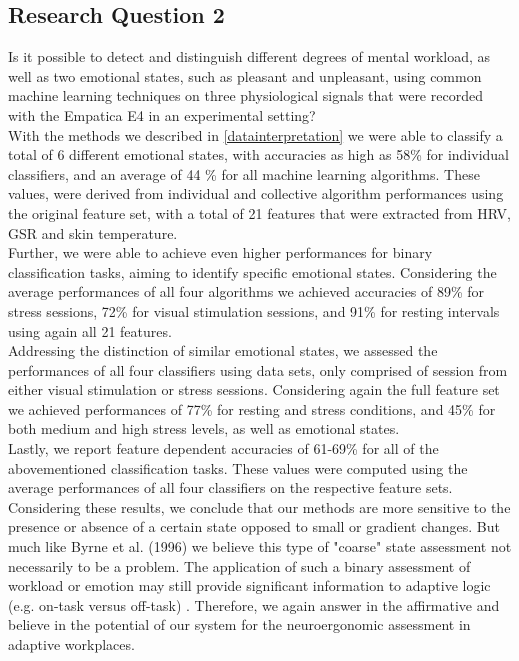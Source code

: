 \subsection{Research Question 2}  
Is it possible to detect and distinguish different degrees of mental workload, as well as two emotional states, such as pleasant and unpleasant, using common machine learning techniques on three physiological signals that were recorded with the Empatica E4 in an experimental setting?\\[10pt]
With the methods we described in \ref{datainterpretation} we were able to classify a total of 6 different emotional states, with accuracies as high as 58\% for individual classifiers, and an average of 44 \% for all machine learning algorithms. These values, were derived from individual and collective algorithm performances using the original feature set, with a total of 21 features that were extracted from HRV, GSR and skin temperature.\\
Further, we were able to achieve even higher performances for binary classification tasks, aiming to identify specific emotional states. Considering the average performances of all four algorithms we achieved accuracies of 89\% for stress sessions, 72\% for visual stimulation sessions, and 91\% for resting intervals using again all 21 features.\\
Addressing the distinction of similar emotional states, we assessed the performances of all four classifiers using data sets, only comprised of session from either visual stimulation or stress sessions. Considering again the full feature set we achieved performances of 77\% for resting and stress conditions, and 45\% for both medium and high stress levels, as well as emotional states.\\
Lastly, we report feature dependent accuracies of 61-69\% for all of the abovementioned classification tasks. These values were computed using the average performances of all four classifiers on the respective feature sets.\\
Considering these results, we conclude that our methods are more sensitive to the presence or absence of a certain state opposed to small or gradient changes. But much like Byrne et al. (1996) we believe this type of "coarse" state assessment not necessarily to be a problem. The application of such a binary assessment of workload or emotion may still provide significant information to adaptive logic (e.g. on-task versus off-task) \cite{Byrne1996}. Therefore, we again answer in the affirmative and believe in the potential of our system for the neuroergonomic assessment in adaptive workplaces. 

